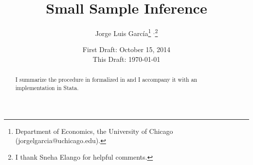 



\title{Small Sample Inference}
\author{Jorge Luis Garc\'{i}a\thanks{Department of Economics, the University of Chicago (jorgelgarcia@uchicago.edu).} $^{,}$\thanks{I thank Sneha Elango for helpful comments.}}
\date{First Draft: October 15, 2014 \\ This Draft: \today}
\maketitle

\begin{abstract}
\noindent I summarize the procedure in \citet{heckman2010analyzing} formalized in \citet{romano2005testing,romano2005exact} and I accompany it with an implementation in Stata. 
\end{abstract}





\clearpage

